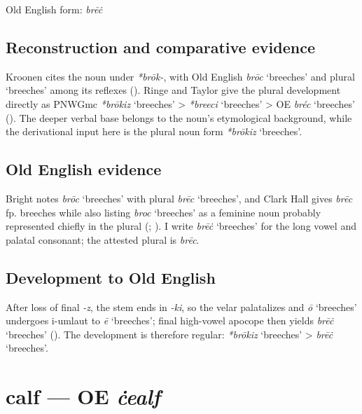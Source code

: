 \documentclass[
  british,
  a4paper,
  openany]{book}
\providecommand{\Recon}[1]{\emph{*#1}}
{\catcode`→=\active \global\def→{\ensuremath{\rightarrow}}}
\providecommand{\texorpdfstring}[2]{#1}
\providecommand{\Recon}[1]{\emph{*#1}}
{\catcode`→=\active \global\def→{\ensuremath{\rightarrow}}}
\begin{document}
Old English form: \emph{brēċ}

\subsection{Reconstruction and comparative
evidence}\label{reconstruction-and-comparative-evidence-9}

Kroonen cites the noun under \emph{*brōk-}, with Old English \emph{brōc}
`breeches' and plural `breeches' among its reflexes
(). Ringe and Taylor give the
plural development directly as PNWGmc \Recon{brōkiz} `breeches'
\textgreater{} \Recon{breeci} `breeches' \textgreater{} OE \emph{bréc}
`breeches' (). The
deeper verbal base belongs to the noun's etymological background, while
the derivational input here is the plural noun form \Recon{brōkiz}
`breeches'.

\subsection{Old English evidence}\label{old-english-evidence-9}

Bright notes \emph{brōc} `breeches' with plural \emph{brēc} `breeches',
and Clark Hall gives \emph{brēc} fp. breeches while also listing
\emph{broc} `breeches' as a feminine noun probably represented chiefly
in the plural (;
). I write \emph{brēċ}
`breeches' for the long vowel and palatal consonant; the attested plural
is \emph{brēc}.

\subsection{Development to Old
English}\label{development-to-old-english-9}

After loss of final \emph{-z}, the stem ends in \emph{-ki}, so the velar
palatalizes and \emph{ō} `breeches' undergoes i-umlaut to \emph{ē}
`breeches'; final high-vowel apocope then yields \emph{brēċ} `breeches'
(). The development
is therefore regular: \Recon{brōkiz} `breeches' \textgreater{}
\emph{brēċ} `breeches'.

\section{\texorpdfstring{calf --- OE
\emph{ċealf}}{calf --- OE ċealf}}\label{calf-oe-ux10bealf}
\end{document}
